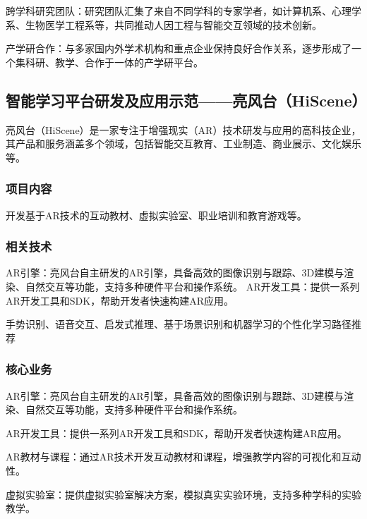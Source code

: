 跨学科研究团队：研究团队汇集了来自不同学科的专家学者，如计算机系、心理学系、生物医学工程系等，共同推动人因工程与智能交互领域的技术创新。

产学研合作：与多家国内外学术机构和重点企业保持良好合作关系，逐步形成了一个集科研、教学、合作于一体的产学研平台。

\subsection{智能学习平台研发及应用示范——亮风台（HiScene）}\label{智能学习平台研发及应用示范——亮风台（HiScene）}

亮风台（HiScene）是一家专注于增强现实（AR）技术研发与应用的高科技企业，其产品和服务涵盖多个领域，包括智能交互教育、工业制造、商业展示、文化娱乐等。

\subsubsection{项目内容}


开发基于AR技术的互动教材、虚拟实验室、职业培训和教育游戏等。

\subsubsection{相关技术}


AR引擎：亮风台自主研发的AR引擎，具备高效的图像识别与跟踪、3D建模与渲染、自然交互等功能，支持多种硬件平台和操作系统。
AR开发工具：提供一系列AR开发工具和SDK，帮助开发者快速构建AR应用。

手势识别、语音交互、启发式推理、基于场景识别和机器学习的个性化学习路径推荐

\subsubsection{核心业务}


AR引擎：亮风台自主研发的AR引擎，具备高效的图像识别与跟踪、3D建模与渲染、自然交互等功能，支持多种硬件平台和操作系统。

AR开发工具：提供一系列AR开发工具和SDK，帮助开发者快速构建AR应用。

AR教材与课程：通过AR技术开发互动教材和课程，增强教学内容的可视化和互动性。

虚拟实验室：提供虚拟实验室解决方案，模拟真实实验环境，支持多种学科的实验教学。

